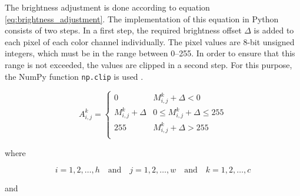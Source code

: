 The brightness adjustment is done according to equation \ref{eq:brightness_adjustment}.
The implementation of this equation in Python consists of two steps.
In a first step, the required brightness offset $\Delta$ is added to each pixel of each color channel individually.
The pixel values are 8-bit unsigned integers, which must be in the range between \numrange{0}{255}.
In order to ensure that this range is not exceeded, the values are clipped in a second step.
For this purpose, the NumPy function \texttt{np.clip} is used \cite{training_numpy_clip}.

\begin{equation}
  A_{i,j}^{k} =
  \begin{cases}
    0 & M_{i,j}^{k} + \Delta < 0 \\
    M_{i,j}^{k} + \Delta & 0\leq M_{i,j}^{k} + \Delta\leq 255 \\
    255 & M_{i,j}^{k} + \Delta > 255 \\
  \end{cases}
  \label{eq:brightness_adjustment}
\end{equation}

where

\[
  i = 1, 2, \dots, h \quad \text{and} \quad j = 1, 2, \dots, w \quad \text{and} \quad k = 1, 2, \dots, c
\]

and

